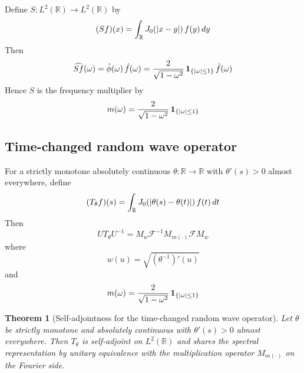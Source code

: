 \documentclass{article}
\newcommand{\cdummy}{\cdot}
\newcommand{\tmtextbf}[1]{\text{{\bfseries{#1}}}}
\newtheorem{theorem}{Theorem}
\begin{document}
Define $S : L^2 (\mathbb{R}) \to L^2 (\mathbb{R})$ by
\begin{equation}
  (Sf) (x) = \int_{\mathbb{R}} J_0 (|x - y|)  \hspace{0.17em} f (y) 
  \hspace{0.17em} dy
\end{equation}
Then
\begin{equation}
  \widehat{Sf} (\omega) = \hat{\phi} (\omega)  \hspace{0.17em} \hat{f}
  (\omega) = \frac{2}{\sqrt{1 - \omega^2}}  \hspace{0.17em}
  \text{\tmtextbf{1}}_{\{| \omega | \le 1\}} \hspace{0.17em} \hat{f} (\omega)
\end{equation}
Hence $S$ is the frequency multiplier by
\begin{equation}
  m (\omega) = \frac{2}{\sqrt{1 - \omega^2}} \hspace{0.17em}
  \text{\tmtextbf{1}}_{\{| \omega | \le 1\}}
\end{equation}

\subsection{Time-changed random wave operator}

For a strictly monotone absolutely continuous $\theta : \mathbb{R} \to
\mathbb{R}$ with $\theta' (s) > 0$ almost everywhere, define
\begin{equation}
  (T_{\theta} f) (s) = \int_{\mathbb{R}} J_0 (| \theta (s) - \theta (t) |) 
  \hspace{0.17em} f (t)  \hspace{0.17em} dt
\end{equation}
Then
\begin{equation}
  UT_{\theta} U^{- 1} = M_w \mathcal{F}^{- 1} M_{m (\cdummy)} \mathcal{F}M_w
\end{equation}
where
\begin{equation}
  w (u) = \sqrt{(\theta^{- 1})' (u)}
\end{equation}
and
\begin{equation}
  m (\omega) = \frac{2}{\sqrt{1 - \omega^2}} \hspace{0.17em}
  \text{\tmtextbf{1}}_{\{| \omega | \le 1\}}
\end{equation}
\begin{theorem}[Self-adjointness for the time-changed random wave operator]
  Let $\theta$ be strictly monotone and absolutely continuous with $\theta'
  (s) > 0$ almost everywhere. Then $T_{\theta}$ is self-adjoint on $L^2
  (\mathbb{R})$ and shares the spectral representation by unitary equivalence
  with the multiplication operator $M_{m (\cdummy)}$ on the Fourier side.
\end{theorem}
\end{document}
